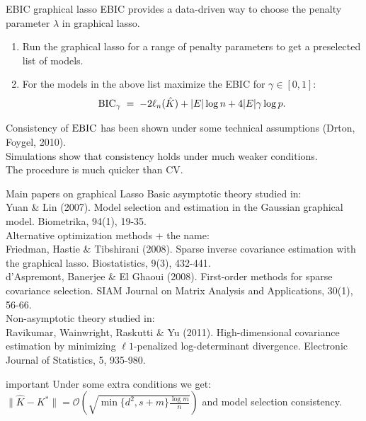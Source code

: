 \documentclass[dvipsnames,aspectratio=169]{beamer} %
\begin{document}
\begin{frame}{EBIC graphical lasso}
	EBIC provides a data-driven way to choose the penalty parameter $\lambda$ in graphical lasso.
	
	\begin{enumerate}
		\item Run the graphical lasso for a range of penalty parameters to get a preselected list of models.\\[.2cm]
		\item For the models in the above list maximize the EBIC for $\gamma\in [0,1]$: $${\rm BIC}_\gamma\;=\;-2\ell_n(\hat K)+|E|\log n+4|E|\gamma\log p.$$
	\end{enumerate}
	Consistency of ${\rm EBIC}$ has been shown under some technical assumptions (Drton, Foygel, 2010).\\[.2cm] Simulations show that consistency holds under much weaker conditions.\\[.2cm]
	The procedure is much quicker than CV. 
\end{frame}


\begin{frame}{Main papers on graphical Lasso}
Basic asymptotic theory studied in:\\
	{\scriptsize Yuan \& Lin (2007). Model selection and estimation in the Gaussian graphical model. Biometrika, 94(1), 19-35. }\\[.3cm]

Alternative optimization methods + the name:\\	
	{\scriptsize 	Friedman, Hastie \& Tibshirani (2008). Sparse inverse covariance estimation with the graphical lasso. Biostatistics, 9(3), 432-441.}\\[.1cm]
	{\scriptsize 	d'Aspremont, Banerjee \& El Ghaoui (2008). First-order methods for sparse covariance selection. SIAM Journal on Matrix Analysis and Applications, 30(1), 56-66.}\\[.3cm]
	
	Non-asymptotic theory studied in:\\
	{\scriptsize Ravikumar, Wainwright, Raskutti \& Yu (2011). High-dimensional covariance estimation by minimizing $\ell 1$-penalized log-determinant divergence. Electronic Journal of Statistics, 5, 935-980.}\\[.2cm]
	\begin{beamercolorbox}[wd=\paperwidth,sep=5pt]{important}
Under some extra conditions we get: 	$\|\hat K-K^*\|=\mathcal O\left(\sqrt{\min\{d^2,s+m\}\tfrac{\log m}{n}}\right)$	 and model selection consistency.
	\end{beamercolorbox}
\end{frame}
\end{document}
